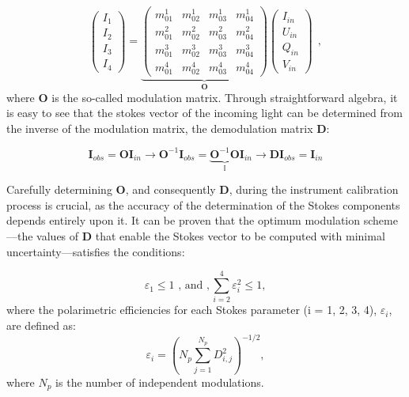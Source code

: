 \begin{equation}
  \begin{pmatrix}
  I _ 1 \\
  I _ 2 \\
  I _ 3 \\
  I _ 4
  \end{pmatrix} = 
  \underbrace{\begin{pmatrix} 
      m ^ 1 _ {01} & m ^ 1 _ {02} & m ^ 1 _ {03} & m ^ 1 _ {04} \\ 
      m ^ 2 _ {01} & m ^ 2 _ {02} & m ^ 2 _ {03} & m ^ 2 _ {04} \\
      m ^ 3 _ {01} & m ^ 3 _ {02} & m ^ 3 _ {03} & m ^ 3 _ {04} \\
      m ^ 4 _ {01} & m ^ 4 _ {02} & m ^ 4 _ {03} & m ^ 4 _ {04} 
  \end{pmatrix}}_ {\textbf{O}}
  \begin{pmatrix}
    I _ {in} \\
    U _ {in} \\
    Q _ {in} \\
    V _ {in}
    \end{pmatrix} \ \ , 
    \label{eq_spectro_theory: stokes_linear_comb}
\end{equation}
where $\textbf{O}$ is the so-called modulation matrix. Through straightforward algebra, it is easy to see that the stokes vector of the incoming light can be determined from the inverse of the modulation matrix, the demodulation matrix $\textbf{D}$: 

\begin{equation}
  \textbf{I}_{obs} = \textbf{O}\textbf{I}_{in}\longrightarrow \textbf{O} ^{-1} \textbf{I}_{obs} = \underbrace{ \textbf{O} ^{-1}\textbf{O}}_{\mathbb{I}}\textbf{I}_{in} \longrightarrow \textbf{D} \textbf{I}_{obs} = \textbf{I}_{in}
\end{equation}

Carefully determining $\textbf{O}$, and consequently $\textbf{D}$, during the instrument calibration process is crucial, as the accuracy of the determination of the Stokes components depends entirely upon it. It can be proven \citep{optimum_modulation} that the optimum modulation scheme—the values of $\textbf{D}$ that enable the Stokes vector to be computed with minimal uncertainty—satisfies the conditions:

\begin{equation}
  \varepsilon _ 1 \leqslant 1 \text{     , and     }, \sum _ {i = 2} ^4 \varepsilon _ i ^2 \leqslant 1,
  \label{eq_intro:optimum_efficiencies}
\end{equation}
where the polarimetric efficiencies for each Stokes parameter (i = 1, 2, 3, 4), $\varepsilon _ i$, are defined as:
\begin{equation}
  \varepsilon _ i = \left( N_p \sum _ {j = 1} ^ {N_p} D _ {i, j} ^2\right) ^{-1/2},
  \label{eq_intro: polarimetric_efficiencies_definition}
\end{equation}
where $N_p$ is the number of independent modulations. 

